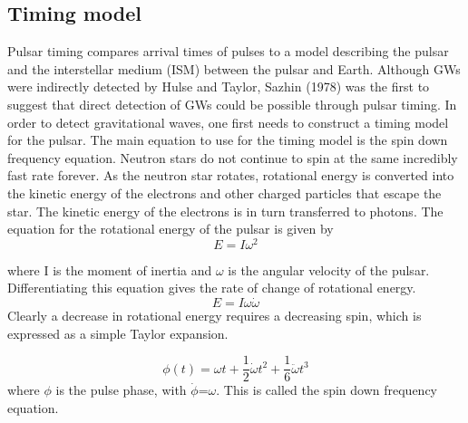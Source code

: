 \documentclass[12pt]{article}
\begin{document}
	\subsection{Timing model}\label{Timing model}
	
	Pulsar timing compares arrival times of pulses to a model describing the pulsar and the interstellar medium (ISM) between the pulsar and Earth. Although GWs were indirectly detected by Hulse and Taylor, Sazhin (1978) was the ﬁrst to suggest that direct detection of GWs could be possible through pulsar timing. In order to detect gravitational waves, one first needs to construct a timing model for the pulsar. The main equation to use for the timing model is the spin down frequency equation. Neutron stars do not continue to spin at the same incredibly fast rate forever. As the neutron star rotates, rotational energy is converted into the kinetic energy of the electrons and other charged particles that escape the star. The kinetic energy of the electrons is in turn transferred to photons. The equation for the rotational energy of the pulsar is given by
	\begin{equation}\label{rotational energy}
	E=I \omega^2
	\end{equation}
	
	where I is the moment of inertia and $\omega$ is the angular velocity of the pulsar. Differentiating this equation gives the rate of change of rotational energy.
	\begin{equation}\label{rotational energy derivative}
	E=I \omega \dot{\omega}
	\end{equation}
	Clearly a decrease in rotational energy requires a decreasing spin, which is expressed as a simple Taylor expansion.
	
	\begin{equation}\label{spin down frequency equation}
	\phi(t)=\omega t +\frac{1}{2}\dot{\omega} t^2+\frac{1}{6} \ddot{\omega} t^3
	\end{equation}
	where $\phi$ is the pulse phase, with $\dot{\phi}$=${\omega}$. This is called the spin down frequency equation.\\
	
\end{document}
